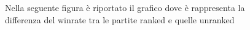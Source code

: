 \begin{figure}[htbp]
\begin{center}
\hspace*{-0.15\linewidth}

\caption{Nella seguente figura è riportato il grafico dove è rappresenta la differenza del winrate tra le partite ranked e quelle unranked}
\label{differenza_winrate_ranked_unranked}
\end{center}
\end{figure}